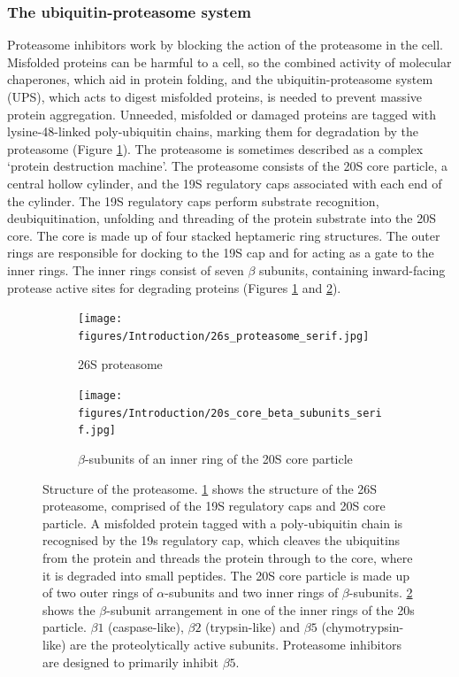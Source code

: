\subsubsection{The ubiquitin-proteasome system}
Proteasome inhibitors work by blocking the action of the proteasome in the cell.
Misfolded proteins can be harmful to a cell, so the combined activity of molecular chaperones, which aid in protein folding, and the ubiquitin-proteasome system (UPS), which acts to digest misfolded proteins, is needed to prevent massive protein aggregation.
Unneeded, misfolded or damaged proteins are tagged with lysine-48-linked poly-ubiquitin chains, marking them for degradation by the proteasome (Figure \ref{fig:26s_proteasome_structure}).
The proteasome is sometimes described as a complex `protein destruction machine'.
The proteasome consists of the 20S core particle, a central hollow cylinder, and the 19S regulatory caps associated with each end of the cylinder.
The 19S regulatory caps perform substrate recognition, deubiquitination, unfolding and threading of the protein substrate into the 20S core.
The core is made up of four stacked heptameric ring structures.
The outer rings are responsible for docking to the 19S cap and for acting as a gate to the inner rings. The inner rings consist of seven $\beta$ subunits, containing inward-facing protease active sites for degrading proteins\cite{kleiger2014perilous, alberts2007molecular} (Figures \ref{fig:26s_proteasome_structure} and  \ref{fig:proteasome_beta_subunits}).

\begin{figure}[hbt]
\begin{subfigure}[t]{0.5\textwidth}
    \texttt{[image: figures/Introduction/26s\_proteasome\_serif.jpg]}
    \caption{26S proteasome}
    \label{fig:26s_proteasome_structure}
\end{subfigure}
\begin{subfigure}[t]{0.5\textwidth}
    \texttt{[image: figures/Introduction/20s\_core\_beta\_subunits\_serif.jpg]}
    \caption{$\beta$-subunits of an inner ring of the 20S core particle }
    \label{fig:proteasome_beta_subunits}
\end{subfigure}
    \caption[Structure of the proteasome]{Structure of the proteasome. \ref{fig:26s_proteasome_structure} shows the structure of the 26S proteasome, comprised of the 19S regulatory caps and 20S core particle.
    A misfolded protein tagged with a poly-ubiquitin chain is recognised by the 19s regulatory cap, which cleaves the ubiquitins from the protein and threads the protein through to the core, where it is degraded into small peptides.
    The 20S core particle is made up of two outer rings of $\alpha$-subunits and two inner rings of $\beta$-subunits.
    \ref{fig:proteasome_beta_subunits} shows the $\beta$-subunit arrangement in one of the inner rings of the 20s particle.
    $\beta1$ (caspase-like), $\beta2$ (trypsin-like) and $\beta5$ (chymotrypsin-like) are the proteolytically active subunits.
    Proteasome inhibitors are designed to primarily inhibit $\beta5$.}
\label{fig:proteasome_and_beta}
\end{figure}

